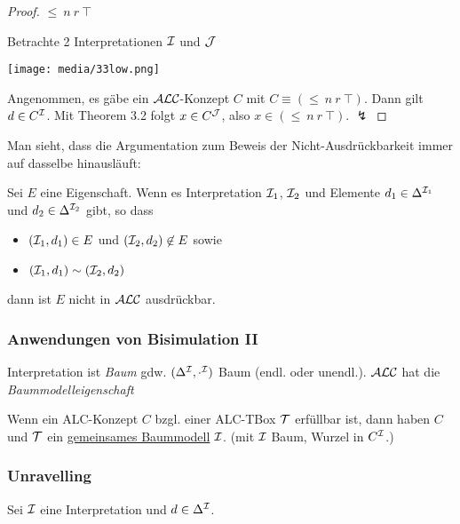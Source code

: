 \begin{proof}
$\leq\ n\ r\ \top$

Betrachte 2 Interpretationen $\mathcal{I}$ und $\mathcal{J}$

\texttt{[image: media/33low.png]}

Angenommen, es gäbe ein $\mathcal{A}\mathcal{L}\mathcal{C}$-Konzept $C$ mit $C \equiv (\leq\ n\ r\ \top)$. Dann gilt $d \in C^{\mathcal{I}}$. Mit Theorem 3.2 folgt $x \in C^{\mathcal{J}}$, also $x \in (\leq\ n\ r\ \top)$. $\lightning$
\end{proof}

Man sieht, dass die Argumentation zum Beweis der Nicht-Ausdrückbarkeit immer auf dasselbe hinausläuft:
\begin{theorem}

Sei $E$ eine Eigenschaft. Wenn es Interpretation $\mathcal{I}_{1}$, $\mathcal{I}_{2}$
und Elemente $d_{1} \in \Delta^{\mathcal{I}_{1}}$ und
$d_{2} \in \Delta^{\mathcal{I}_{2}}$ gibt, so dass

\begin{itemize}
\item
  $\left( \mathcal{I}_{1},d_{1} \right) \in E$ und
  $\left( \mathcal{I}_{2},d_{2} \right) \not\in E$ sowie
\item
  $(\mathcal{I}_{1},d_{1}) \sim (\mathcal{I}_{2},d_{2})$
\end{itemize}

dann ist $E$ nicht in $\mathcal{A}\mathcal{L}\mathcal{C}$ ausdrückbar.
\end{theorem}

\subsubsection{Anwendungen von Bisimulation II}\label{theorem-3.6}

Interpretation ist \emph{Baum} gdw. $(\Delta^{\mathcal{I}}, \cdot^{\mathcal{I}})$ Baum (endl. oder unendl.). $\mathcal{A}\mathcal{L}\mathcal{C}$ hat die \emph{Baummodelleigenschaft}

\begin{theorem}
Wenn ein ALC-Konzept $C$ bzgl. einer ALC-TBox $\mathcal{T}$ erfüllbar ist,
dann haben $C$ und $\mathcal{T}$ ein \underline{gemeinsames Baummodell} $\mathcal{I}$. (mit $\mathcal{I}$ Baum, Wurzel in $C^{\mathcal{I}}$.)
\end{theorem}

\subsubsection{Unravelling}\label{unravelling}

Sei $\mathcal{I}$ eine Interpretation und $d \in \Delta^{\mathcal{I}}$. 

